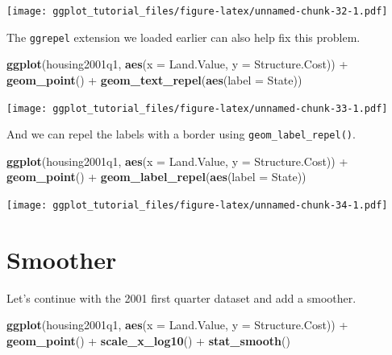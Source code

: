 \documentclass[]{article}
\newenvironment{Shaded}{\begin{snugshade}}{\end{snugshade}}
\newcommand{\KeywordTok}[1]{\textcolor[rgb]{0.13,0.29,0.53}{\textbf{{#1}}}}
\newcommand{\DataTypeTok}[1]{\textcolor[rgb]{0.13,0.29,0.53}{{#1}}}
\newcommand{\StringTok}[1]{\textcolor[rgb]{0.31,0.60,0.02}{{#1}}}
\newcommand{\NormalTok}[1]{{#1}}
\theoremstyle{definition}
\theoremstyle{definition}
\theoremstyle{definition}
\theoremstyle{remark}
\begin{document}
\texttt{[image: ggplot\_tutorial\_files/figure-latex/unnamed-chunk-32-1.pdf]}

The \texttt{ggrepel} extension we loaded earlier can also help fix this
problem.

\begin{Shaded}
\begin{Highlighting}[]
\KeywordTok{ggplot}\NormalTok{(housing2001q1, }\KeywordTok{aes}\NormalTok{(}\DataTypeTok{x =} \NormalTok{Land.Value, }\DataTypeTok{y =} \NormalTok{Structure.Cost)) +}\StringTok{ }
\StringTok{  }\KeywordTok{geom_point}\NormalTok{() +}
\StringTok{  }\KeywordTok{geom_text_repel}\NormalTok{(}\KeywordTok{aes}\NormalTok{(}\DataTypeTok{label =} \NormalTok{State))}
\end{Highlighting}
\end{Shaded}

\texttt{[image: ggplot\_tutorial\_files/figure-latex/unnamed-chunk-33-1.pdf]}

And we can repel the labels with a border using
\texttt{geom\_label\_repel()}.

\begin{Shaded}
\begin{Highlighting}[]
\KeywordTok{ggplot}\NormalTok{(housing2001q1, }\KeywordTok{aes}\NormalTok{(}\DataTypeTok{x =} \NormalTok{Land.Value, }\DataTypeTok{y =} \NormalTok{Structure.Cost)) +}\StringTok{ }
\StringTok{  }\KeywordTok{geom_point}\NormalTok{() +}
\StringTok{  }\KeywordTok{geom_label_repel}\NormalTok{(}\KeywordTok{aes}\NormalTok{(}\DataTypeTok{label =} \NormalTok{State))}
\end{Highlighting}
\end{Shaded}

\texttt{[image: ggplot\_tutorial\_files/figure-latex/unnamed-chunk-34-1.pdf]}

\section{Smoother}\label{smoother}

Let's continue with the 2001 first quarter dataset and add a smoother.

\begin{Shaded}
\begin{Highlighting}[]
\KeywordTok{ggplot}\NormalTok{(housing2001q1, }\KeywordTok{aes}\NormalTok{(}\DataTypeTok{x =} \NormalTok{Land.Value, }\DataTypeTok{y =} \NormalTok{Structure.Cost)) +}\StringTok{ }
\StringTok{  }\KeywordTok{geom_point}\NormalTok{() +}\StringTok{ }
\StringTok{  }\KeywordTok{scale_x_log10}\NormalTok{() +}
\StringTok{  }\KeywordTok{stat_smooth}\NormalTok{()}
\end{Highlighting}
\end{Shaded}
\end{document}

